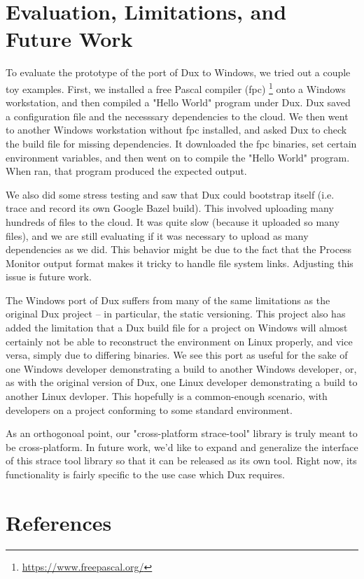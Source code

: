 \documentclass[10pt,conference]{IEEEtran}
\begin{document}
\section{Evaluation, Limitations, and Future Work}

To evaluate the prototype of the port of Dux to Windows, we tried out a couple toy
examples. First, we installed a free Pascal compiler (fpc) 
\footnote{\url{https://www.freepascal.org/}} onto a Windows workstation,
and then compiled a "Hello World" program under Dux. Dux saved a configuration 
file and the necesssary dependencies to the cloud. We then went to another Windows
workstation without fpc installed, and asked Dux to check the build file for missing
dependencies. It downloaded the fpc binaries, set certain environment variables,
and then went on to compile the "Hello World" program. When ran, that program
produced the expected output.

We also did some stress testing and saw that Dux could bootstrap itself (i.e. trace
and record its own Google Bazel build). This involved uploading many hundreds
of files to the cloud. It was quite slow (because it uploaded so many files), 
and we are still evaluating if it was necessary to upload as many dependencies as
we did. This behavior might be due to the fact that the Process Monitor output format
makes it tricky to handle file system links. Adjusting this issue is future work.

The Windows port of Dux suffers from many of the same limitations as the original
Dux project -- in particular, the static versioning. This project also has added
the limitation that a Dux build file for a project on Windows will almost certainly
not be able to reconstruct the environment on Linux properly, and vice versa,
simply due to differing binaries. We see this port as useful for the sake of one
Windows developer demonstrating a build to another Windows developer, or, as 
with the original  version of Dux, one Linux developer demonstrating a build to 
another Linux devloper. This hopefully is a common-enough scenario, with
developers on a project conforming to some standard environment. 

As an orthogonoal point, our "cross-platform strace-tool" library is truly meant to be
cross-platform. In future work, we'd like to expand and generalize the interface of this 
strace tool library so that it can be released as its own tool. Right now, its
functionality is fairly specific to the use case which Dux requires.

\section{References}
\end{document}

